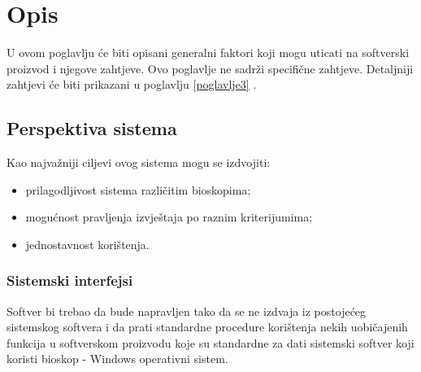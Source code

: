 \chapter{Opis}

U ovom poglavlju će biti opisani generalni faktori koji mogu uticati na softverski proizvod i njegove zahtjeve. 
Ovo poglavlje ne sadrži specifične zahtjeve. Detaljniji zahtjevi će biti prikazani u poglavlju \ref{poglavlje3} .

\section{Perspektiva sistema}

Kao najvažniji ciljevi ovog sistema mogu se izdvojiti:
\begin{itemize}
  \item prilagodljivost sistema različitim bioskopima;
  \item mogućnost pravljenja izvještaja po raznim kriterijumima;
  \item jednostavnost korištenja.
\end{itemize}

\subsection{Sistemski interfejsi}

Softver bi trebao da bude napravljen tako da se ne izdvaja iz postojećeg sistemskog softvera i da prati standardne procedure korištenja nekih uobičajenih funkcija u softverskom proizvodu koje su standardne za dati sistemski softver koji koristi bioskop - Windows operativni sistem. 

